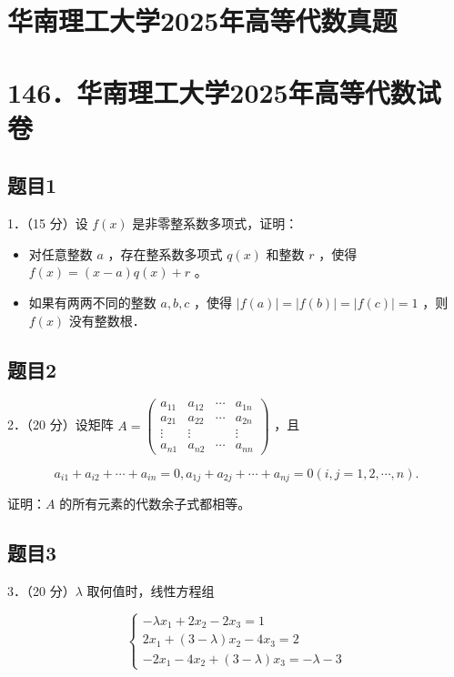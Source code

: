 \documentclass{article}
\begin{document}
\section*{华南理工大学2025年高等代数真题}
\section*{146．华南理工大学2025年高等代数试卷}

\subsection{题目1}
1．（15 分）设 \(f(x)\) 是非零整系数多项式，证明：

\begin{itemize}
  \item[（1）] 对任意整数 \(a\) ，存在整系数多项式 \(q(x)\) 和整数 \(r\) ，使得 \(f(x)=(x-a) q(x)+r\) 。
  \item[（2）] 如果有两两不同的整数 \(a, b, c\) ，使得 \(|f(a)|=|f(b)|=|f(c)|=1\) ，则 \(f(x)\) 没有整数根．
\end{itemize}

\subsection{题目2}
2．（20 分）设矩阵 \(A=\left(\begin{array}{cccc}a_{11} & a_{12} & \cdots & a_{1 n} \\ a_{21} & a_{22} & \cdots & a_{2 n} \\ \vdots & \vdots & & \vdots \\ a_{n 1} & a_{n 2} & \cdots & a_{n n}\end{array}\right)\) ，且

\[
a_{i 1}+a_{i 2}+\cdots+a_{i n}=0, a_{1 j}+a_{2 j}+\cdots+a_{n j}=0(i, j=1,2, \cdots, n) .
\]

证明：\(A\) 的所有元素的代数余子式都相等。

\subsection{题目3}
3．（20 分）\(\lambda\) 取何值时，线性方程组

\[
\left\{\begin{array}{l}
-\lambda x_{1}+2 x_{2}-2 x_{3}=1 \\
2 x_{1}+(3-\lambda) x_{2}-4 x_{3}=2 \\
-2 x_{1}-4 x_{2}+(3-\lambda) x_{3}=-\lambda-3
\end{array}\right.
\]
\end{document}
